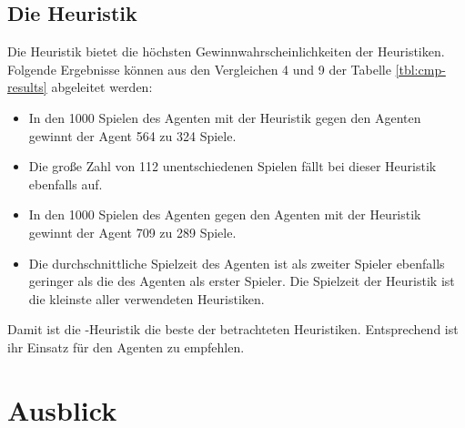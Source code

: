\subsection{Die Heuristik }
Die  Heuristik bietet die höchsten Gewinnwahrscheinlichkeiten der  Heuristiken. Folgende Ergebnisse können aus den Vergleichen 4 und 9 der Tabelle \ref{tbl:cmp-results} abgeleitet werden:
\begin{itemize}
\item In den 1000 Spielen des  Agenten mit der  Heuristik gegen den  Agenten gewinnt der  Agent 564 zu 324 Spiele.
\item Die große Zahl von 112 unentschiedenen Spielen fällt bei dieser Heuristik ebenfalls auf.
\item In den 1000 Spielen des  Agenten gegen den  Agenten mit der  Heuristik gewinnt der  Agent 709 zu 289 Spiele.
\item Die durchschnittliche Spielzeit des Agenten ist als zweiter Spieler ebenfalls geringer als die des Agenten als erster Spieler. Die Spielzeit der  Heuristik ist die kleinste aller verwendeten Heuristiken.
\end{itemize}
Damit ist die -Heuristik die beste der betrachteten Heuristiken. Entsprechend ist ihr Einsatz für den Agenten \mxZitat{\abp} zu empfehlen.


\section{Ausblick}
